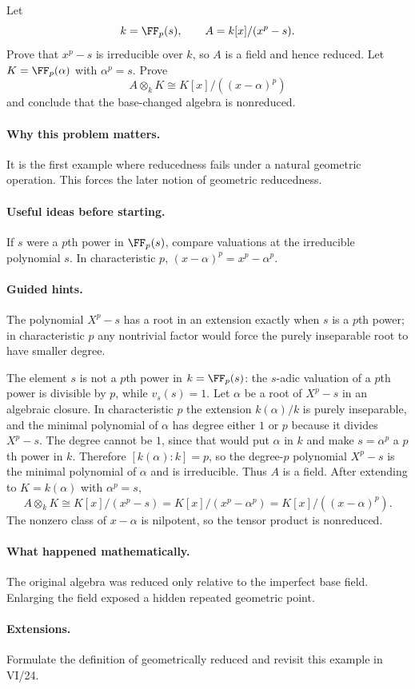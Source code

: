 \begin{problem}
Let
\[
k=\FF_p(s),\qquad A=k[x]/(x^p-s).
\]
Prove that $x^p-s$ is irreducible over $k$, so $A$ is a field and hence reduced.  Let
$K=\FF_p(\alpha)$ with $\alpha^p=s$.  Prove
\[
A\otimes_kK\cong K[x]/((x-\alpha)^p)
\]
and conclude that the base-changed algebra is nonreduced.
\end{problem}
\paragraph{Why this problem matters.}
It is the first example where reducedness fails under a natural geometric operation.  This
forces the later notion of geometric reducedness.
\paragraph{Useful ideas before starting.}
If $s$ were a $p$th power in $\FF_p(s)$, compare valuations at the irreducible polynomial
$s$.  In characteristic $p$, $(x-\alpha)^p=x^p-\alpha^p$.
\paragraph{Guided hints.}
The polynomial $X^p-s$ has a root in an extension exactly when $s$ is a $p$th power; in
characteristic $p$ any nontrivial factor would force the purely inseparable root to have
smaller degree.
\begin{solution}
The element $s$ is not a $p$th power in $k=\FF_p(s)$: the $s$-adic valuation of a $p$th
power is divisible by $p$, while $v_s(s)=1$.  Let $\alpha$ be a root of $X^p-s$ in an
algebraic closure.  In characteristic $p$ the extension $k(\alpha)/k$ is purely
inseparable, and the minimal polynomial of $\alpha$ has degree either $1$ or $p$ because
it divides $X^p-s$.  The degree cannot be $1$, since that would put $\alpha$ in $k$ and
make $s=\alpha^p$ a $p$th power in $k$.  Therefore $[k(\alpha):k]=p$, so the degree-$p$
polynomial $X^p-s$ is the minimal polynomial of $\alpha$ and is irreducible.  Thus $A$
is a field.
After extending to $K=k(\alpha)$ with $\alpha^p=s$,
\[
A\otimes_kK
\cong K[x]/(x^p-s)
=K[x]/(x^p-\alpha^p)
=K[x]/((x-\alpha)^p).
\]
The nonzero class of $x-\alpha$ is nilpotent, so the tensor product is nonreduced.
\end{solution}
\paragraph{What happened mathematically.}
The original algebra was reduced only relative to the imperfect base field.  Enlarging the
field exposed a hidden repeated geometric point.
\paragraph{Extensions.}
Formulate the definition of geometrically reduced and revisit this example in VI/24.
